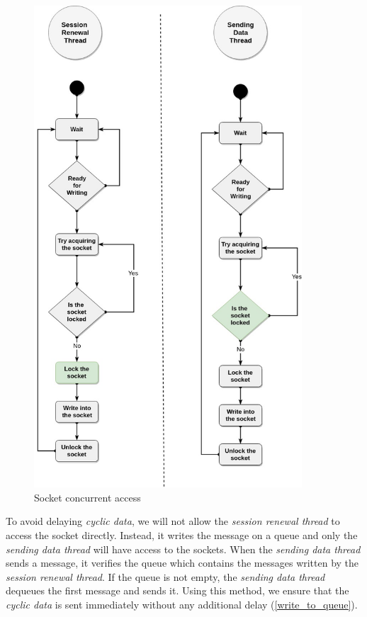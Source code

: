 \begin{figure}[H]
\centering
\includegraphics[width=10cm]{figures/realization/write_to_queue.jpg}
\caption{Socket concurrent access}\label{mutex_write_socket}
\end{figure}

To avoid delaying \textit{cyclic data}, we will not allow the \textit{session renewal thread} to access the socket directly.
Instead, it writes the message on a queue and only the \textit{sending data thread} will have access to the sockets.
When the \textit{sending data thread} sends a message, it verifies the queue which contains the messages written by the
\textit{session renewal thread}. If the queue is not empty, the \textit{sending data thread} dequeues the first message and sends it.
Using this method, we ensure that the \textit{cyclic data} is sent immediately without any additional delay (\autoref{write_to_queue}).

